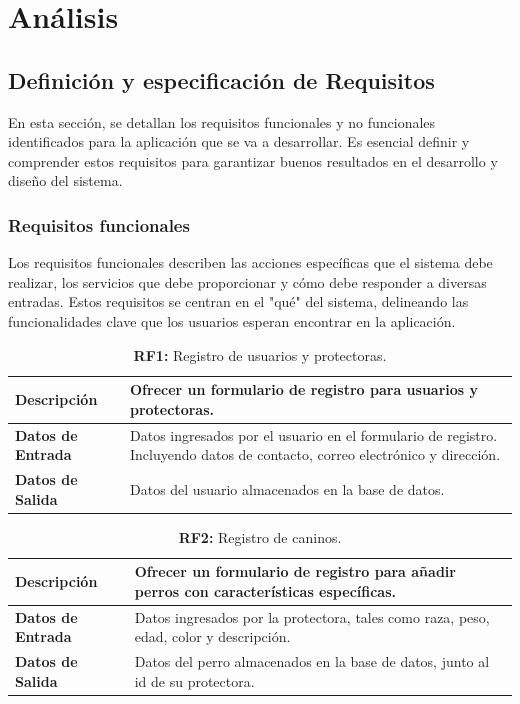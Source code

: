 \documentclass[a4paper, 12pt]{article}
\begin{document}
\newpage
\section{Análisis}

\subsection{Definición y especificación de Requisitos}

En esta sección, se detallan los requisitos funcionales y no funcionales identificados para la aplicación que se va a desarrollar. Es esencial definir y comprender estos requisitos para garantizar buenos resultados en el desarrollo y diseño del sistema.

\subsubsection{Requisitos funcionales}

Los requisitos funcionales describen las acciones específicas que el sistema debe realizar, los servicios que debe proporcionar y cómo debe responder a diversas entradas. Estos requisitos se centran en el "qué" del sistema, delineando las funcionalidades clave que los usuarios esperan encontrar en la aplicación.

\begin{table}[H]
\captionsetup{justification=raggedright,singlelinecheck=false}
\caption{\textbf{RF1:} Registro de usuarios y protectoras.}
\label{tab:RF1}
	\begin{tabular}{|m{5cm}|m{10cm}|}
	\hline
	\textbf{Descripción} & Ofrecer un formulario de registro para usuarios y protectoras. \\ 
	\hline
	\textbf{Datos de Entrada} & Datos ingresados por el usuario en el formulario de registro. Incluyendo datos de contacto, correo electrónico y dirección. \\ 
	\hline
	\textbf{Datos de Salida} & Datos del usuario almacenados en la base de datos. \\ 
	\hline
\end{tabular}
\end{table}

\begin{table}[H]
\captionsetup{justification=raggedright,singlelinecheck=false}
\caption{\textbf{RF2:} Registro de caninos.}
\label{tab:RF2}
	\begin{tabular}{|m{5cm}|m{10cm}|}
	\hline
	\textbf{Descripción} & Ofrecer un formulario de registro para añadir perros con características específicas. \\ 
	\hline
	\textbf{Datos de Entrada} & Datos ingresados por la protectora, tales como raza, peso, edad, color y descripción. \\ 
	\hline
	\textbf{Datos de Salida} & Datos del perro almacenados en la base de datos, junto al id de su protectora. \\ 
	\hline
\end{tabular}
\end{table}
\end{document}
